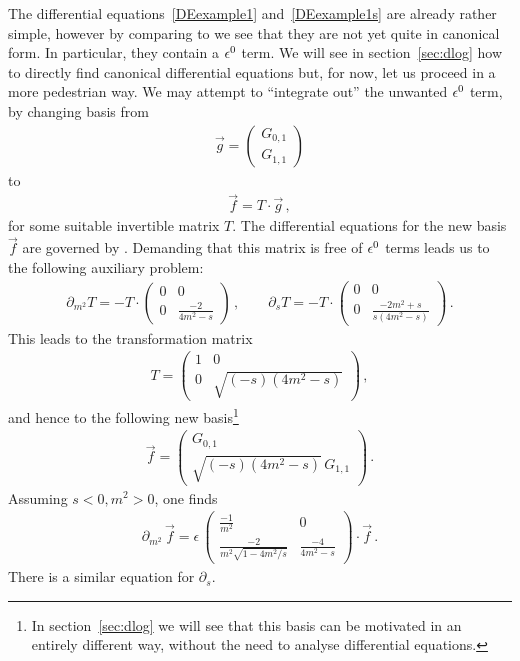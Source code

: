 The differential equations~\eqref{DEexample1} and~\eqref{DEexample1s} are already rather simple,
however by comparing to  we see that they are not yet quite in canonical form.
In particular, they contain a $\epsilon^0$ term.
We will see in section~\ref{sec:dlog} how to directly find canonical differential equations but, for now,
let us proceed in a more pedestrian way.
We may attempt to ``integrate out'' the unwanted $\epsilon^0$ term, by changing basis from
\begin{align}
\vec{g} = 
 \begin{pmatrix}
G_{0,1}\\
G_{1,1}
\end{pmatrix}
\end{align}
to
\begin{align}
\vec{f} = T \cdot \vec{g}\,,
\end{align}
for some suitable invertible matrix $T$.
The differential equations for the new basis $\vec{f}$ are governed by .
Demanding that this matrix is free of $\epsilon^0$ terms leads us to the following auxiliary problem:
\begin{align}
\partial_{m^2} T
=
- T  \cdot 
\begin{pmatrix}
0 & 0 \\
0 & \frac{-2}{4 m^2-s} 
\end{pmatrix}
\,,
\qquad 
\partial_{s} T
=
- T \cdot
\begin{pmatrix}
0 & 0 \\
0 & \frac{-2 m^2+s}{s(4 m^2-s)} 
\end{pmatrix}
 \,.
\end{align} 
This leads to the transformation matrix
\begin{align}
T = 
\begin{pmatrix}
1 & 0 \\
0 &\sqrt{(-s) (4m^2-s)}  
\end{pmatrix}
 \,,
\end{align}
and hence to the following new basis\footnote{In section~\ref{sec:dlog} we will see that this basis can be motivated in an entirely different way, without the need to analyse differential equations.}
\begin{align}\label{eq:UTbasisbubble}
\vec{f} = \begin{pmatrix}
G_{0,1}\\
\sqrt{(-s) (4m^2-s)} \, G_{1,1}
\end{pmatrix}\,.
\end{align}
Assuming $s<0,m^2>0$, one finds
\begin{align}\label{DEexample2}
\partial_{m^2} \, \vec{f} 
=
\epsilon \,
\begin{pmatrix}
\frac{-1}{m^2} & 0 \\
\frac{-2}{m^2 \sqrt{1-4 m^2/s}}  & \frac{-4 }{4 m^2-s}  
\end{pmatrix}
\cdot \vec{f} 
\,.
\end{align}
There is a similar equation for $\partial_s$.

